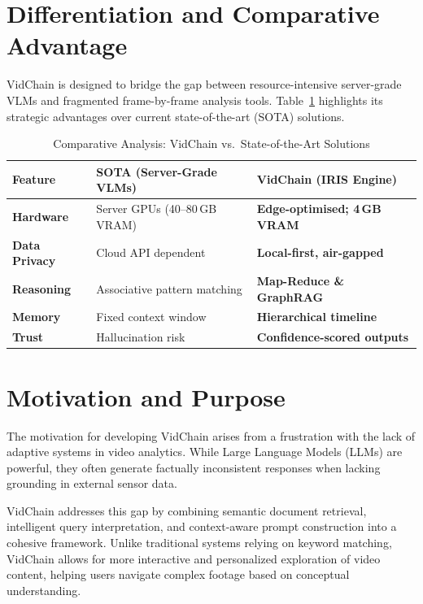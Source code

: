 \section{Differentiation and Comparative Advantage}
VidChain is designed to bridge the gap between resource-intensive server-grade VLMs and fragmented frame-by-frame analysis tools. Table~\ref{tab:differentiation} highlights its strategic advantages over current state-of-the-art (SOTA) solutions.

\begin{table}[H]
\centering
\small
\caption{Comparative Analysis: VidChain vs.\ State-of-the-Art Solutions}
\label{tab:differentiation}
\begin{tabularx}{\textwidth}{|l|X|X|}
\hline
\rowcolor[HTML]{EFEFEF} 
\textbf{Feature} & \textbf{SOTA (Server-Grade VLMs)} & \textbf{VidChain (IRIS Engine)} \\ \hline
\textbf{Hardware} & Server GPUs (40--80\,GB VRAM) & \textbf{Edge-optimised; 4\,GB VRAM} \\ \hline
\textbf{Data Privacy} & Cloud API dependent & \textbf{Local-first, air-gapped} \\ \hline
\textbf{Reasoning} & Associative pattern matching & \textbf{Map-Reduce \& GraphRAG} \\ \hline
\textbf{Memory} & Fixed context window & \textbf{Hierarchical timeline} \\ \hline
\textbf{Trust} & Hallucination risk & \textbf{Confidence-scored outputs} \\ \hline
\end{tabularx}
\end{table}

\section{Motivation and Purpose}
The motivation for developing VidChain arises from a frustration with the lack of adaptive systems in video analytics. While Large Language Models (LLMs) are powerful, they often generate factually inconsistent responses when lacking grounding in external sensor data. 

VidChain addresses this gap by combining semantic document retrieval, intelligent query interpretation, and context-aware prompt construction into a cohesive framework. Unlike traditional systems relying on keyword matching, VidChain allows for more interactive and personalized exploration of video content, helping users navigate complex footage based on conceptual understanding. 

